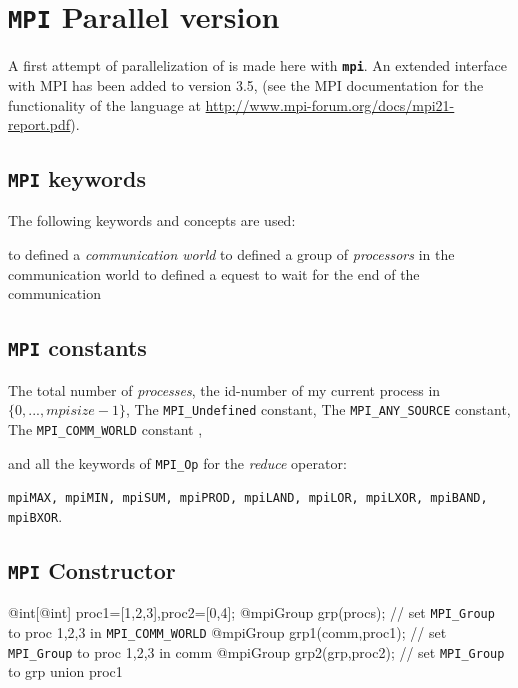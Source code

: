 \documentclass[a4paper,twoside,12pt]{book}
\begin{document}
\section{\texttt{MPI} Parallel version }
A first attempt of parallelization of \freefempp is made here with {\bf\texttt{mpi}}.
An extended interface with MPI has been added to \freefempp version 3.5,  (see the MPI documentation for the functionality 
of the language at \url{http://www.mpi-forum.org/docs/mpi21-report.pdf}).


\subsection{\texttt{MPI}  keywords}
The following keywords and concepts are used:
\begin{description}
\itemtt[mpiComm] to defined a  \emph{communication world}
\itemtt[mpiGroup] to defined a group of\emph{ processors} in the communication world
\itemtt[mpiRequest] to defined a  equest to wait for the end of the communication
\end{description}

\subsection{\texttt{MPI} constants}
\begin{description}
\itemtt[mpisize] The total number of  \emph{processes},
\itemtt[mpirank]  the id-number of my current process in $\{0,..., mpisize-1\}$,
\itemtt[mpiUndefined]  The \verb!MPI_Undefined! constant,
\itemtt[mpiAnySource]  The \verb!MPI_ANY_SOURCE! constant,
\itemtt[mpiCommWorld]  The \verb!MPI_COMM_WORLD! constant ,
\item[ ... ] and all the keywords of \texttt{MPI\_Op} for the \emph{reduce} operator: 

\texttt{mpiMAX, mpiMIN, mpiSUM, mpiPROD, mpiLAND, mpiLOR, mpiLXOR, mpiBAND, mpiBXOR}.
\end{description}

\medskip
\subsection{\texttt{MPI} Constructor}
\bFF
   @int[@int] proc1=[1,2,3],proc2=[0,4];
   @mpiGroup grp(procs); // set \texttt{MPI\_Group} to proc 1,2,3 in \texttt{MPI\_COMM\_WORLD}
   @mpiGroup grp1(comm,proc1); // set \texttt{MPI\_Group} to proc 1,2,3 in comm
   @mpiGroup grp2(grp,proc2); // set \texttt{MPI\_Group} to  grp union proc1
\end{document}
